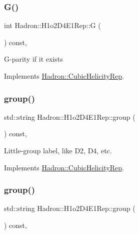 \subsubsection{\texorpdfstring{G()}{G()}\hspace{0.1cm}{\footnotesize\ttfamily [3/3]}}
{\footnotesize\ttfamily int Hadron\+::\+H1o2\+D4\+E1\+Rep\+::G (\begin{DoxyParamCaption}{ }\end{DoxyParamCaption}) const\hspace{0.3cm}{\ttfamily [inline]}, {\ttfamily [virtual]}}

G-\/parity if it exists 

Implements \mbox{\hyperlink{structHadron_1_1CubicHelicityRep_a50689f42be1e6170aa8cf6ad0597018b}{Hadron\+::\+Cubic\+Helicity\+Rep}}.

\mbox{\label{structHadron_1_1H1o2D4E1Rep_a450bf31aa04b582fae7cf5cdb6c987f7}} 
\subsubsection{\texorpdfstring{group()}{group()}\hspace{0.1cm}{\footnotesize\ttfamily [1/5]}}
{\footnotesize\ttfamily std\+::string Hadron\+::\+H1o2\+D4\+E1\+Rep\+::group (\begin{DoxyParamCaption}{ }\end{DoxyParamCaption}) const\hspace{0.3cm}{\ttfamily [inline]}, {\ttfamily [virtual]}}

Little-\/group label, like D2, D4, etc. 

Implements \mbox{\hyperlink{structHadron_1_1CubicHelicityRep_a101a7d76cd8ccdad0f272db44b766113}{Hadron\+::\+Cubic\+Helicity\+Rep}}.

\mbox{\label{structHadron_1_1H1o2D4E1Rep_a450bf31aa04b582fae7cf5cdb6c987f7}} 
\subsubsection{\texorpdfstring{group()}{group()}\hspace{0.1cm}{\footnotesize\ttfamily [2/5]}}
{\footnotesize\ttfamily std\+::string Hadron\+::\+H1o2\+D4\+E1\+Rep\+::group (\begin{DoxyParamCaption}{ }\end{DoxyParamCaption}) const\hspace{0.3cm}{\ttfamily [inline]}, {\ttfamily [virtual]}}


